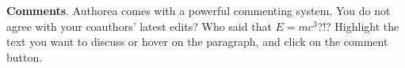 \textbf{Comments}. Authorea comes with a powerful commenting system. You do not agree with your coauthors' latest edits? Who said that $E  =  mc^{3}$?!? Highlight the text you want to discuss or hover on the paragraph, and click on the comment button.